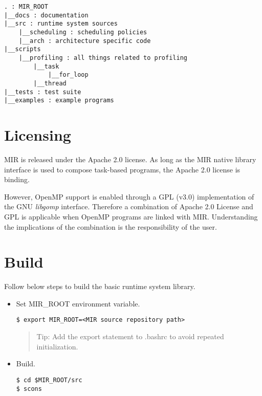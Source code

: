 \documentclass[11pt,a4paper]{article}
\begin{document}
\begin{lstlisting}[style=MyInputStyle]
. : MIR_ROOT
|__docs : documentation
|__src : runtime system sources
    |__scheduling : scheduling policies
    |__arch : architecture specific code
|__scripts
    |__profiling : all things related to profiling
        |__task
            |__for_loop
        |__thread
|__tests : test suite
|__examples : example programs
\end{lstlisting}

\section{Licensing}\label{sec:license}
MIR is released under the Apache 2.0 license.  As long as the MIR native library interface is used to compose task-based programs, the Apache 2.0 license is binding.

However, OpenMP support is enabled through a GPL (v3.0) implementation of the GNU \textit{libgomp} interface. Therefore a combination of Apache 2.0 License and GPL is applicable when OpenMP programs are linked with MIR. Understanding the implications of the combination is the responsibility of the user.

\section{Build}\label{sec:build}

Follow below steps to build the basic runtime system library.

\begin{itemize}
    \item Set MIR\_ROOT environment variable.

\begin{lstlisting}[style=MyInputStyle]
$ export MIR_ROOT=<MIR source repository path>
\end{lstlisting}

\begin{framed}
\begin{quote}
Tip: Add the export statement to .bashrc to avoid repeated initialization.
\end{quote}
\end{framed}

    \item Build.

\begin{lstlisting}[style=MyInputStyle]
$ cd $MIR_ROOT/src
$ scons
\end{lstlisting}
\end{itemize}
\end{document}
